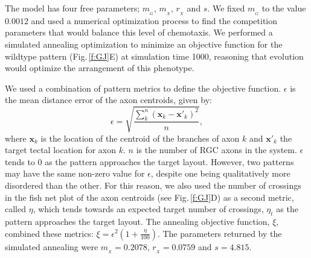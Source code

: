 \documentclass[11pt, a4paper]{article}
\begin{document}
The model has four free parameters; $m_{\!_G}$, $m_{\!_X}$, $r_{\!_X}$ and $s$. We fixed $m_{\!_G}$ to the value $0.0012$ and used a numerical optimization process to find the competition parameters that would balance this level of chemotaxis.
We performed a simulated annealing optimization to minimize an objective function for the wildtype pattern (Fig.\,\ref{f:GJ}E) at simulation time 1000, reasoning that evolution would optimize the arrangement of this phenotype.

We used a combination of pattern metrics to define the objective function. $\epsilon$ is the mean distance error of the axon centroids, given by:
%
\begin{equation}\label{e:eps}
\epsilon = \sqrt{\frac{\sum_k^n (\mathbf{x}_{k} - \mathbf{x}'_{k})^2}{n}},
\end{equation}
%
where $\mathbf{x}_{k}$ is the location of the centroid of the branches of axon $k$ and $\mathbf{x}'_{k}$ the target tectal location for axon $k$.
$n$ is the number of RGC axons in the system.
%
$\epsilon$ tends to 0 as the pattern approaches the target layout.
However, two patterns may have the same non-zero value for $\epsilon$, despite one being qualitatively more disordered than the other. 
For this reason, we also used the number of crossings in the fish net plot of the axon centroids (see Fig.\,\ref{f:GJ}D) as a second metric, called $\eta$, which tends towards an expected target number of crossings, $\eta_t$ as the pattern approaches the target layout. The annealing objective function, $\xi$, combined these metrics: $\xi = \epsilon^2 (1+\frac{\eta}{100})$.
The parameters returned by the simulated annealing were
$m_{\!_X} = 0.2078$, $r_{\!_X} = 0.0759$ and $s = 4.815$. 
\end{document}
